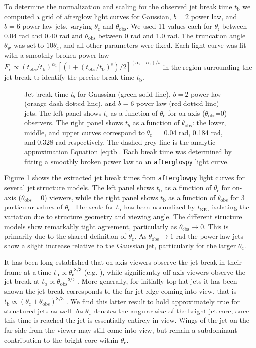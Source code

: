 \documentclass[twocolumn]{aastex62}
\newcommand{\afterglowpy}{{\tt afterglowpy}}
\newcommand{\tobs}{\ensuremath{t_{\mathrm{obs}}}}
\newcommand{\tNR}{\ensuremath{t_{\mathrm{NR}}}}
\newcommand{\tb}{\ensuremath{t_{\mathrm{b}}}}
\newcommand{\thobs}{\ensuremath{\theta_{\mathrm{obs}}}}
\newcommand{\thW}{\ensuremath{\theta_{\mathrm{w}}}}
\newcommand{\thC}{\ensuremath{\theta_{\mathrm{c}}}}
\begin{document}
To determine the normalization and scaling for the observed jet break time $\tb$ we computed a grid of afterglow light curves for Gaussian, $b=2$ power law, and $b=6$ power law jets, varying $\thC$ and $\thobs$.  We used 11 values each for $\thC$ between 0.04 rad and 0.40 rad and $\thobs$ between 0 rad and 1.0 rad.  The truncation angle $\thW$ was set to $10 \thC$, and all other parameters were fixed.  Each light curve was fit with a smoothly broken power law $F_\nu \propto (\tobs/\tb)^{\alpha_1} [(1+(\tobs/\tb)^s)/2]^{(\alpha_2-\alpha_1)/s}$ in the region surrounding the jet break to identify the precise break time $\tb$.

\begin{figure}
	\caption{Jet break time $t_b$ for Gaussian (green solid line), $b=2$ power law (orange dash-dotted line), and $b=6$ power law (red dotted line) jets.  The left panel shows $t_b$ as a function of $\thC$ for on-axis (\thobs=0) observers.  The right panel shows $t_b$ as a function of $\thobs$: the lower, middle, and upper curves correspond to $\thC = $ 0.04 rad, 0.184 rad, and 0.328 rad respectively. The dashed grey line is the analytic approximation Equation \eqref{eq:tb}. Each break time was determined by fitting a smoothly broken power law to an \afterglowpy{} light curve. \label{fig:tb}}
\end{figure}

Figure \ref{fig:tb} shows the extracted jet break times from \afterglowpy{} light curves for several jet structure models.  The left panel shows $\tb$ as a function of $\thC$ for on-axis ($\thobs=0$) viewers, while the right panel shows $\tb$ as a function of $\thobs$ for 3 particular values of $\thC$.  The scale for $\tb$ has been normalized by $\tNR$, isolating the variation due to structure geometry and viewing angle.  The different structure models show remarkably tight agreement, particularly as $\thobs \to 0$.  This is primarily due to the shared definition of $\thC$.  As $\thobs \to 1$ rad the power law jets show a slight increase relative to the Gaussian jet, particularly for the larger $\thC$.  

It has been long established that on-axis viewers observe the jet break in their frame at a time $\tb \propto \thC^{8/3}$ (e.g. \citet{Rhoads:1999aa}), while significantly off-axis viewers observe the jet break at $\tb \propto \thobs^{8/3}$ \citep{Rossi:2002aa, Panaitescu:2003aa}.  More generally, for initially top hat jets it has been shown the jet break corresponds to the far jet edge coming into view, that is $\tb \propto (\thC + \thobs)^{8/3}$ \citep{van-Eerten:2010aa}.  We find this latter result to hold approximately true for structured jets as well.  As $\thC$ denotes the angular size of the bright jet core, once this time is reached the jet is essentially entirely in view.  Wings of the jet on the far side from the viewer may still come into view, but remain a subdominant contribution to the bright core within $\thC$.  
\end{document}
